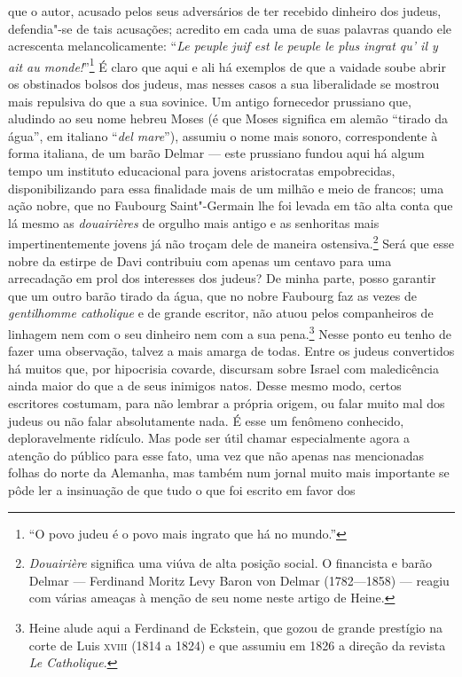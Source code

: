 que o autor, acusado pelos seus adversários de ter recebido dinheiro
dos judeus, defendia"-se de tais acusações; acredito em cada uma de
suas palavras quando ele acrescenta melancolicamente: “\textit{Le
peuple juif est le peuple le plus ingrat qu’ il y ait au
monde!}”\footnote{ “O povo judeu é o povo mais ingrato que há no
mundo.”} É claro que aqui e ali há exemplos de que a vaidade soube
abrir os obstinados bolsos dos judeus, mas nesses casos a sua
liberalidade se mostrou mais repulsiva do que a sua sovinice. Um antigo
fornecedor prussiano que, aludindo ao seu nome hebreu Moses (é que
Moses significa em alemão “tirado da água”, em italiano “\textit{del
mare}”), assumiu o nome mais sonoro, correspondente à forma italiana,
de um barão Delmar --- este prussiano fundou aqui há algum tempo um
instituto educacional para jovens aristocratas empobrecidas,
disponibilizando para essa finalidade mais de um milhão e meio de
francos; uma ação nobre, que no Faubourg Saint"-Germain lhe foi levada
em tão alta conta que lá mesmo as \textit{douairières} de orgulho mais
antigo e as senhoritas mais impertinentemente jovens já não troçam dele
de maneira ostensiva.\footnote{ \textit{Douairière} significa uma viúva
de alta posição social. O financista e barão Delmar --- Ferdinand Moritz
Levy Baron von Delmar (1782---1858) --- reagiu com várias ameaças à
menção de seu nome neste artigo de Heine.} Será que esse nobre da
estirpe de Davi contribuiu com apenas um centavo para uma arrecadação
em prol dos interesses dos judeus? De minha parte, posso garantir que
um outro barão tirado da água, que no nobre Faubourg faz as vezes de
\textit{gentilhomme catholique} e de grande escritor, não atuou pelos
companheiros de linhagem nem com o seu dinheiro nem com a sua
pena.\footnote{ Heine alude aqui a Ferdinand de Eckstein, que gozou de
grande prestígio na corte de Luis \textsc{xviii} (1814 a 1824) e que assumiu em
1826 a direção da revista \textit{Le Catholique}.} Nesse ponto eu
tenho de fazer uma observação, talvez a mais amarga de todas. Entre os
judeus convertidos há muitos que, por hipocrisia covarde, discursam
sobre Israel com maledicência ainda maior do que a de seus inimigos
natos. Desse mesmo modo, certos escritores costumam, para não lembrar a
própria origem, ou falar muito mal dos judeus ou não falar
absolutamente nada. É esse um fenômeno conhecido, deploravelmente
ridículo. Mas pode ser útil chamar especialmente agora a atenção do
público para esse fato, uma vez que não apenas nas mencionadas folhas
do norte da Alemanha, mas também num jornal muito mais importante se
pôde ler a insinuação de que tudo o que foi escrito em favor dos 
